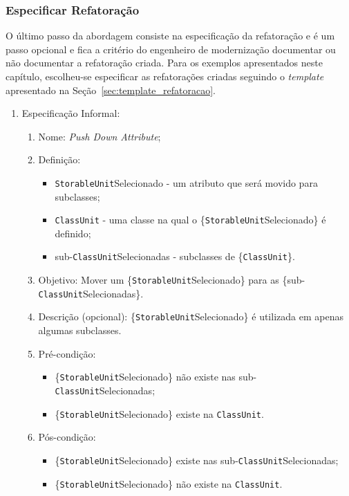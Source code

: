 \subsubsection{Especificar Refatoração}

O último passo da abordagem consiste na especificação da refatoração e é um passo opcional e fica a critério do engenheiro de modernização documentar ou não documentar a refatoração criada. Para os exemplos apresentados neste capítulo, escolheu-se especificar as refatorações criadas seguindo o \textit{template} apresentado na Seção~\ref{sec:template_refatoracao}.

\begin{enumerate}
	\item Especificação Informal:
		\begin{enumerate}
			\item Nome: \textit{Push Down Attribute};
			\item Definição:
			    \begin{itemize}
			        \item \texttt{StorableUnit}Selecionado - um atributo que será movido para subclasses;
			        \item \texttt{ClassUnit} - uma classe na qual o \{\texttt{StorableUnit}Selecionado\} é definido;
			        \item sub-\texttt{ClassUnit}Selecionadas - subclasses de \{\texttt{ClassUnit}\}.
			    \end{itemize}
			\item Objetivo: Mover um \{\texttt{StorableUnit}Selecionado\} para as \{sub-\texttt{ClassUnit}Selecionadas\}.
			\item Descrição (opcional): \{\texttt{StorableUnit}Selecionado\} é utilizada em apenas algumas subclasses.
			\item Pré-condição:
			    \begin{itemize}
			        \item \{\texttt{StorableUnit}Selecionado\} não existe nas sub-\texttt{ClassUnit}Selecionadas; 
			        \item \{\texttt{StorableUnit}Selecionado\} existe na \texttt{ClassUnit}. 
			    \end{itemize}
			\item Pós-condição:
			    \begin{itemize}
			        \item \{\texttt{StorableUnit}Selecionado\} existe nas sub-\texttt{ClassUnit}Selecionadas;
			        \item \{\texttt{StorableUnit}Selecionado\} não existe na \texttt{ClassUnit}.

\end{itemize}
\end{enumerate}
\end{enumerate}
